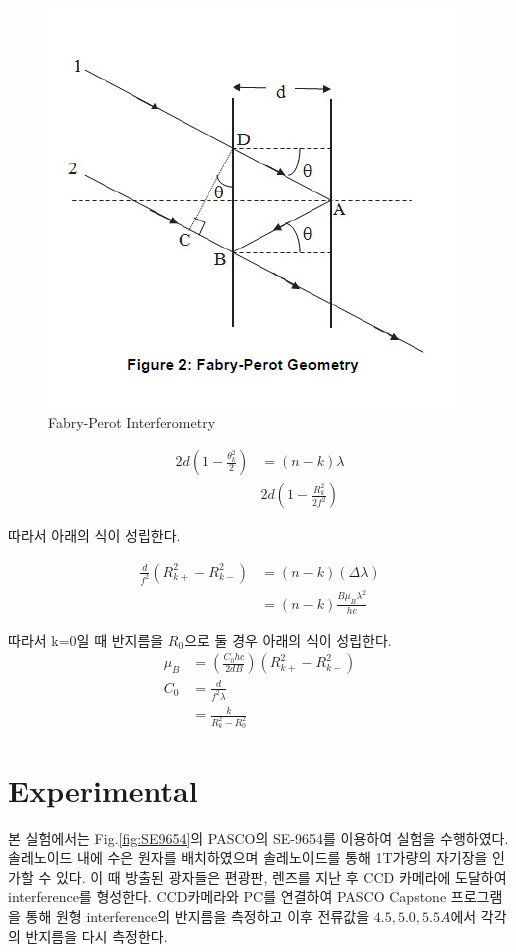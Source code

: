 \documentclass[%
 reprint,
 amsmath,amssymb,
 aps,
]{revtex4-2}
\begin{document}
\begin{figure}[htbp]
	\includegraphics[width = 0.95\linewidth]{Fabry.png}%
	\caption{\label{fig:Fabry}Fabry-Perot Interferometry}
\end{figure}

\begin{align}
	2d\left(1-\frac{\theta^{2}_{k}}{2} \right) &= (n-k)\lambda\\
	&2d\left(1-\frac{R^{2}_{k}}{2f^{2}} \right)
\end{align}

따라서 아래의 식이 성립한다.

\begin{align}
	\frac{d}{f^{2}}(R_{k+}^{2}-R_{k-}^{2}) &=(n-k)(\Delta\lambda)\\
	&= (n-k)\frac{B\mu_{B}\lambda^{2}}{hc}
\end{align}

따라서 k=0일 때 반지름을 $R_{0}$으로 둘 경우 아래의 식이 성립한다.
\begin{align}
	\mu_{B} &= \left( \frac{C_{0}hc}{2dB}\right)(R_{k+}^{2}-R_{k-}^{2})\\
	C_{0} &= \frac{d}{f^{2}\lambda}\\
	&= \frac{k}{R_{k}^{2}-R_{0}^{2}}
\end{align}

\section{\label{sec:level1}Experimental}
본 실험에서는 Fig.\ref{fig:SE9654}의 PASCO의 SE-9654를 이용하여 실험을 수행하였다. 솔레노이드 내에 수은 원자를 배치하였으며 솔레노이드를 통해 1T가량의 자기장을 인가할 수 있다. 이 때 방출된 광자들은 편광판, 렌즈를 지난 후 CCD 카메라에 도달하여 interference를 형성한다. CCD카메라와 PC를 연결하여 PASCO Capstone 프로그램을 통해 원형 interference의 반지름을 측정하고 이후 전류값을 $4.5, 5.0, 5.5A$에서 각각의 반지름을 다시 측정한다.
\end{document}
